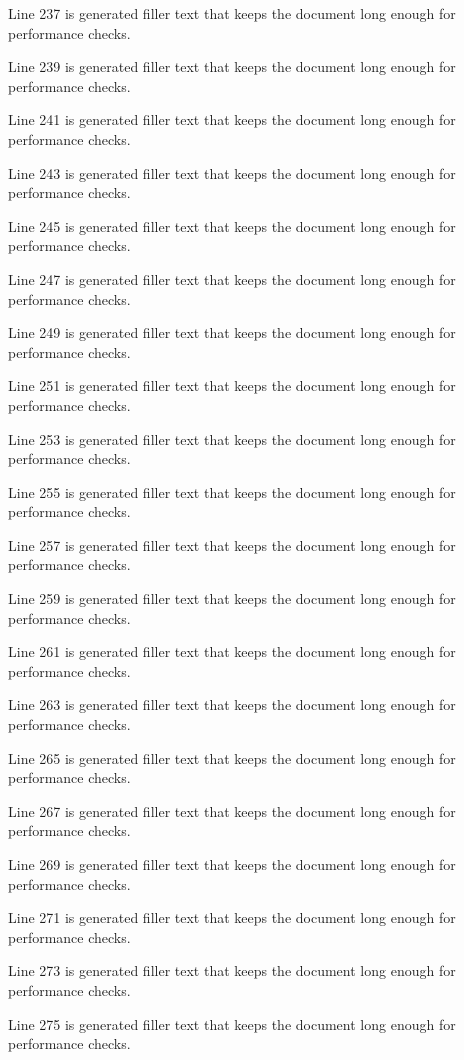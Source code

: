 Line 237 is generated filler text that keeps the document long enough for performance checks.

Line 239 is generated filler text that keeps the document long enough for performance checks.

Line 241 is generated filler text that keeps the document long enough for performance checks.

Line 243 is generated filler text that keeps the document long enough for performance checks.

Line 245 is generated filler text that keeps the document long enough for performance checks.

Line 247 is generated filler text that keeps the document long enough for performance checks.

Line 249 is generated filler text that keeps the document long enough for performance checks.

Line 251 is generated filler text that keeps the document long enough for performance checks.

Line 253 is generated filler text that keeps the document long enough for performance checks.

Line 255 is generated filler text that keeps the document long enough for performance checks.

Line 257 is generated filler text that keeps the document long enough for performance checks.

Line 259 is generated filler text that keeps the document long enough for performance checks.

Line 261 is generated filler text that keeps the document long enough for performance checks.

Line 263 is generated filler text that keeps the document long enough for performance checks.

Line 265 is generated filler text that keeps the document long enough for performance checks.

Line 267 is generated filler text that keeps the document long enough for performance checks.

Line 269 is generated filler text that keeps the document long enough for performance checks.

Line 271 is generated filler text that keeps the document long enough for performance checks.

Line 273 is generated filler text that keeps the document long enough for performance checks.

Line 275 is generated filler text that keeps the document long enough for performance checks.

